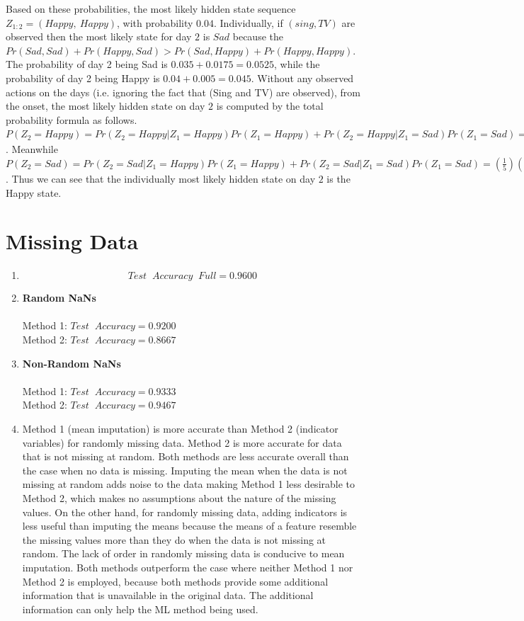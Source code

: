 \documentclass[english]{article}
\begin{document}
	Based on these probabilities, the most likely hidden state sequence $Z_{1:2} = (Happy, \: Happy)$, with probability $0.04$. Individually, if $(sing, TV)$ are observed then the most likely state for day $2$ is $Sad$ because the $Pr(Sad, Sad) + Pr(Happy, Sad) > Pr(Sad, Happy) + Pr(Happy, Happy)$. The probability of day 2 being Sad is $0.035 + 0.0175 = 0.0525$, while the probability of day 2 being Happy is $0.04 + 0.005 = 0.045$. \newline\newline
	Without any observed actions on the days (i.e. ignoring the fact that (Sing and TV) are observed), from the onset, the most likely hidden state on day $2$ is computed by the total probability formula as follows. $P(Z_2 = Happy) = Pr(Z_2 = Happy | Z_1 = Happy)Pr(Z_1 = Happy) + Pr(Z_2 = Happy | Z_1 = Sad)Pr(Z_1 = Sad) = (\frac{4}{5})(\frac{1}{2}) + (\frac{1}{2})(\frac{1}{2}) = \frac{4}{10} + \frac{1}{4} = 0.65$. Meanwhile  $P(Z_2 = Sad) = Pr(Z_2 = Sad | Z_1 = Happy)Pr(Z_1 = Happy) + Pr(Z_2 = Sad | Z_1 = Sad)Pr(Z_1 = Sad) = (\frac{1}{5})(\frac{1}{2}) + (\frac{1}{2})(\frac{1}{2}) = \frac{1}{10} + \frac{1}{4} = 0.35$. Thus we can see that the individually most likely hidden state on day $2$ is the Happy state.  

\newpage
\section{Missing Data}
\begin{enumerate}
    \item $$Test \;\; Accuracy \;\; Full = 0.9600$$
    \item \textbf{Random NaNs} \\ \\
    Method 1: $Test \;\; Accuracy = 0.9200$ \\
    Method 2: $Test \;\; Accuracy = 0.8667$ 
    \item \textbf{Non-Random NaNs} \\ \\
    Method 1: $Test \;\; Accuracy = 0.9333$ \\
    Method 2: $Test \;\; Accuracy = 0.9467$
    \item Method 1 (mean imputation) is more accurate than Method 2 (indicator variables) for randomly missing data. Method 2 is more accurate for data that is not missing at random. Both methods are less accurate overall than the case when no data is missing. Imputing the mean when the data is not missing at random adds noise to the data making Method 1 less desirable to Method 2, which makes no assumptions about the nature of the missing values. On the other hand, for randomly missing data, adding indicators is less useful than imputing the means because the means of a feature resemble the missing values more than they do when the data is not missing at random. The lack of order in randomly missing data is conducive to mean imputation. Both methods outperform the case where neither Method 1 nor Method 2 is employed, because both methods provide some additional information that is unavailable in the original data. The additional information can only help the ML method being used.
    \end{enumerate}
\end{document}
